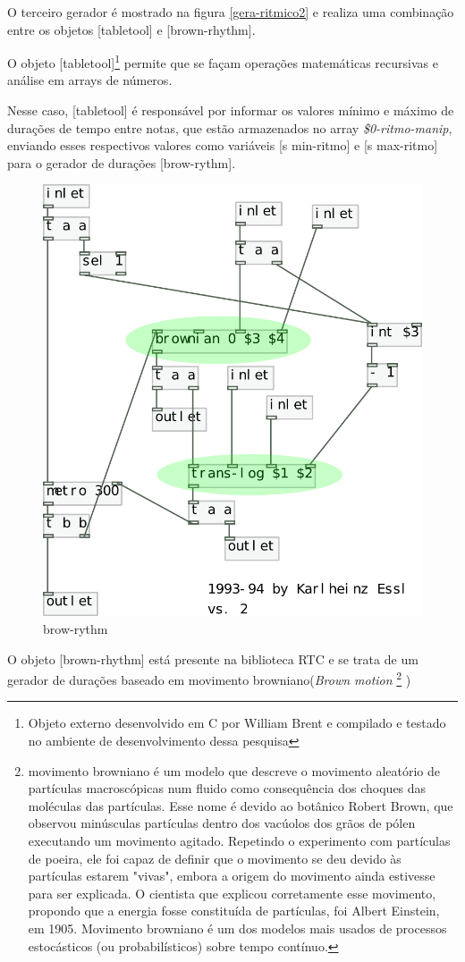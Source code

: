 \documentclass[draft]{ppgmus}
\begin{document}
O terceiro gerador é mostrado na figura \ref{gera-ritmico2} e
realiza uma combinação entre os objetos [tabletool] e [brown-rhythm].

O objeto [tabletool]\footnote{Objeto externo desenvolvido em C
por William Brent e compilado e testado no ambiente de desenvolvimento
dessa pesquisa} permite que se façam operações matemáticas
recursivas e análise em arrays de números. 

Nesse caso, [tabletool] é responsável por informar os valores
mínimo e máximo de durações de tempo entre notas, que estão
armazenados no array \textit{\$0-ritmo-manip}, enviando
esses respectivos valores como variáveis [s min-ritmo] e 
[s max-ritmo] para o gerador de durações [brow-rythm].


 \begin{figure}
\includegraphics[scale=.6]{brown-rythm}
\caption{brow-rythm}
\label{brown-rythm}
\end{figure}  

O objeto [brown-rhythm] está presente na biblioteca RTC e se trata de
um gerador de durações baseado em movimento browniano(\textit{Brown motion}
\footnote{movimento browniano é um modelo que descreve o movimento aleatório 
de partículas macroscópicas num fluido como consequência dos choques das 
moléculas das partículas. Esse nome é devido ao botânico Robert
Brown, que observou minúsculas partículas dentro dos vacúolos dos grãos de 
pólen executando um movimento agitado. Repetindo o experimento com partículas de poeira, 
ele foi capaz de definir que o movimento se deu devido às partículas estarem "vivas", 
embora a origem do movimento ainda estivesse para ser explicada.
O cientista que explicou corretamente esse movimento, propondo que a energia fosse 
constituída de partículas, foi Albert Einstein, em 1905.
Movimento browniano é um dos modelos mais usados de processos estocásticos
(ou probabilísticos) sobre tempo contínuo.} )
\end{document}
